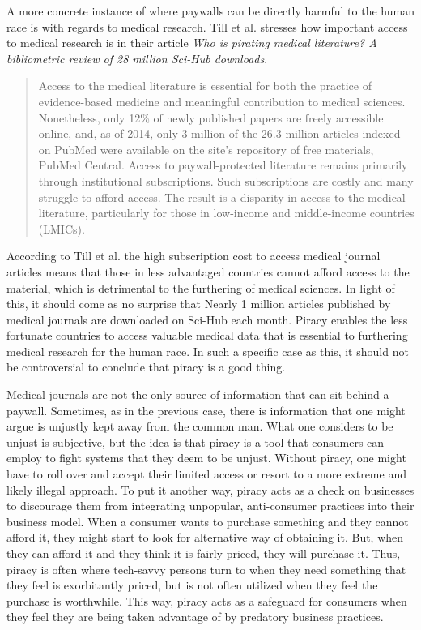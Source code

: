\documentclass[onecolumn, 12pt]{article}
\begin{document}
\begin{refsection}
A more concrete instance of where paywalls can be directly harmful to the human race is
with regards to medical research. Till et al. stresses how important access to medical
research is in their article \textit{Who is pirating medical literature? A bibliometric
review of 28 million Sci-Hub downloads}. \blockcquote{till:medical-literature} {Access to
the medical literature is essential for both the practice of evidence-based medicine and
meaningful contribution to medical sciences. Nonetheless, only 12\% of newly published
papers are freely accessible online, and, as of 2014, only 3 million of the 26.3 million
articles indexed on PubMed were available on the site's repository of free materials,
PubMed Central. Access to paywall-protected literature remains primarily through
institutional subscriptions. Such subscriptions are costly and many struggle to afford
access. The result is a disparity in access to the medical literature, particularly for
those in low-income and middle-income countries (LMICs).}
According to Till et al. the high subscription cost to access medical journal articles
means that those in less advantaged countries cannot afford access to the material, which
is detrimental to the furthering of medical sciences. In light of this, it should come as
no surprise that  {Nearly 1 million articles published
by medical journals are downloaded on Sci-Hub each month.} Piracy enables the less
fortunate countries to access valuable medical data that is essential to furthering
medical research for the human race. In such a specific case as this, it should not be
controversial to conclude that piracy is a good thing.

Medical journals are not the only source of information that can sit behind a paywall.
Sometimes, as in the previous case, there is information that one might argue is unjustly
kept away from the common man. What one considers to be unjust is subjective, but the idea
is that piracy is a tool that consumers can employ to fight systems that they deem to be
unjust. Without piracy, one might have to roll over and accept their limited access or
resort to a more extreme and likely illegal approach. To put it another way, piracy acts
as a check on businesses to discourage them from integrating unpopular, anti-consumer
practices into their business model. When a consumer wants to purchase something and they
cannot afford it, they might start to look for alternative way of obtaining it. But, when
they can afford it and they think it is fairly priced, they will purchase it. Thus, piracy
is often where tech-savvy persons turn to when they need something that they feel is
exorbitantly priced, but is not often utilized when they feel the purchase is worthwhile.
This way, piracy acts as a safeguard for consumers when they feel they are being taken
advantage of by predatory business practices.


\end{refsection}
\end{document}
